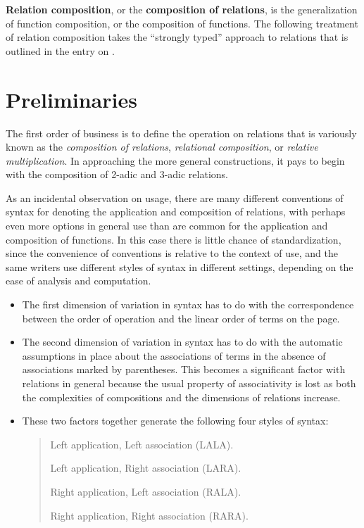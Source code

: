 \documentclass[12pt]{article}
\begin{document}
\textbf{Relation composition}, or the \textbf{composition of relations}, is the generalization of function composition, or the composition of functions.  The following treatment of relation composition takes the ``strongly typed'' approach to relations that is outlined in the entry on .

\tableofcontents

\section{Preliminaries}

The first order of business is to define the operation on relations that is variously known as the \textit{composition of relations}, \textit{relational composition}, or \textit{relative multiplication}.  In approaching the more general constructions, it pays to begin with the composition of 2-adic and 3-adic relations.

As an incidental observation on usage, there are many different conventions of syntax for denoting the application and composition of relations, with perhaps even more options in general use than are common for the application and composition of functions.  In this case there is little chance of standardization, since the convenience of conventions is relative to the context of use, and the same writers use different styles of syntax in different settings, depending on the ease of analysis and computation.

\begin{itemize}
\item
The first dimension of variation in syntax has to do with the correspondence between the order of operation and the linear order of terms on the page.
\item
The second dimension of variation in syntax has to do with the automatic assumptions in place about the associations of terms in the absence of associations marked by parentheses.  This becomes a significant factor with relations in general because the usual property of associativity is lost as both the complexities of compositions and the dimensions of relations increase.
\item
These two factors together generate the following four styles of syntax:

\begin{quote}
Left application, Left association (LALA).

Left application, Right association (LARA).

Right application, Left association (RALA).

Right application, Right association (RARA).
\end{quote}

\end{itemize}
\end{document}
